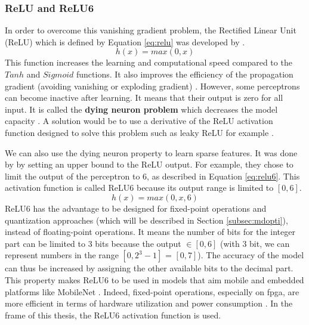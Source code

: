 \subsubsection{ReLU and ReLU6}
In order to overcome this vanishing gradient problem, the Rectified Linear Unit (ReLU) which is defined by Equation \eqref{eq:relu} was developed by \textcite{krizhevsky_imagenet_2012}.
%
\begin{equation}
    h(x) = max(0, x)
    \label{eq:relu}
\end{equation}
%
This function increases the learning and computational speed compared to the $Tanh$ and $Sigmoid$ functions. It also improves the efficiency of the propagation gradient (avoiding vanishing or exploding gradient) \cite{abdelouahab_accelerating_2018, maas_rectier_2013}. However, some perceptrons can become inactive after learning. It means that their output is zero for all input. It is called the \textbf{dying neuron problem} which decreases the model capacity \cite{matteucci_artificial_2019}. A solution would be to use a derivative of the ReLU activation function designed to solve this problem such as leaky ReLU for example \cite{matteucci_artificial_2019, maas_rectier_2013}.

We can also use the dying neuron property to learn sparse features. It was done by \textcite{krizhevsky_convolutional_2010} by setting an upper bound to the ReLU output. For example, they chose to limit the output of the perceptron to 6, as described in Equation \eqref{eq:relu6}. This activation function is called ReLU6 because its output range is limited to $[0, 6]$. 
%
\begin{equation}
    h(x) = max(0, x, 6)
    \label{eq:relu6}
\end{equation}
%
ReLU6 has the advantage to be designed for fixed-point operations and quantization approaches (which will be described in Section \ref{subsec:mdopti}), instead of floating-point operations. It means the number of bits for the integer part can be limited to 3 bits because the output $ \in [0, 6]$ (with 3 bit, we can represent numbers in the range $[0, 2^3-1]$ = $[0, 7]$). The accuracy of the model can thus be increased by assigning the other available bits to the decimal part. This property makes ReLU6 to be used in models that aim mobile and embedded platforms like MobileNet \cite{howard_mobilenets_2017}. Indeed, fixed-point operations, especially on \acrshort{fpga}, are more efficient in terms of hardware utilization and power consumption \cite{david_hardware_2007}. In the frame of this thesis, the ReLU6 activation function is used.


